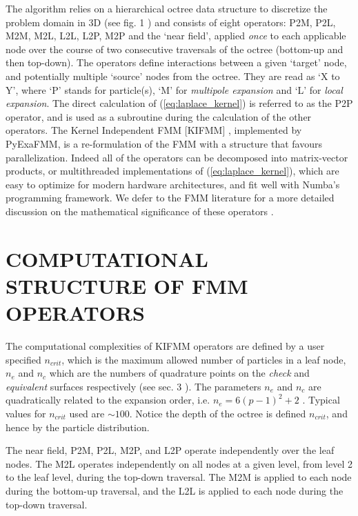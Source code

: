 \documentclass{IEEEcsmag}
\begin{document}
The algorithm relies on a hierarchical octree data structure to discretize the problem domain in 3D (see fig. 1 \cite{Sundar2007}) and consists of eight operators: P2M, P2L, M2M, M2L, L2L, L2P, M2P and the `near field', applied \textit{once} to each applicable node over the course of two consecutive traversals of the octree (bottom-up and then top-down). The operators define interactions between a given `target' node, and potentially multiple `source' nodes from the octree. They are read as `X to Y', where `P' stands for particle(s), `M' for \textit{multipole expansion} and `L' for \textit{local expansion}. The direct calculation of (\ref{eq:laplace_kernel}) is referred to as the P2P operator, and is used as a subroutine during the calculation of the other operators. The Kernel Independent FMM [KIFMM] \cite{Ying2004}, implemented by PyExaFMM, is a re-formulation of the FMM with a structure that favours parallelization. Indeed all of the operators can be decomposed into matrix-vector products, or multithreaded implementations of (\ref{eq:laplace_kernel}), which are easy to optimize for modern hardware architectures, and fit well with Numba's programming framework. We defer to the FMM literature for a more detailed discussion on the mathematical significance of these operators \cite{Ying2004,Greengard1987}.

\section{COMPUTATIONAL STRUCTURE OF FMM OPERATORS}

The computational complexities of KIFMM operators are defined by a user specified $n_{crit}$, which is the maximum allowed number of particles in a leaf node, $n_e$ and $n_c$ which are the numbers of quadrature points on the \textit{check} and \textit{equivalent} surfaces respectively (see sec. 3 \cite{Ying2004}). The parameters $n_e$ and $n_c$ are quadratically related to the expansion order, i.e. $n_e = 6(p-1)^2 + 2$ \cite{Ying2004}. Typical values for $n_{crit}$ used are $\sim 100$. Notice the depth of the octree is defined $n_{crit}$, and hence by the particle distribution.

The near field, P2M, P2L, M2P, and L2P operate independently over the leaf nodes. The M2L operates independently on all nodes at a given level, from level 2 to the leaf level, during the top-down traversal. The M2M is applied to each node during the bottom-up traversal, and the L2L is applied to each node during the top-down traversal.
\end{document}
